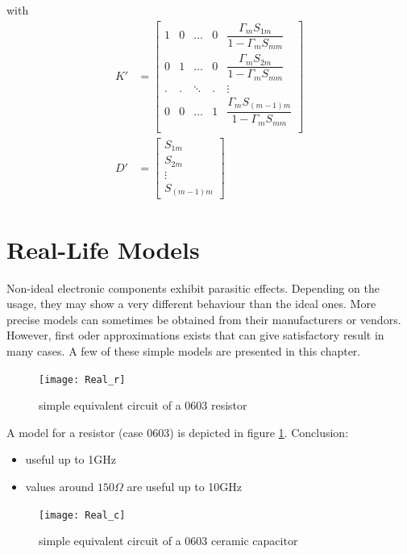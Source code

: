 with
\begin{align}
K' &=
\begin{bmatrix}
1 & 0 & \ldots & 0 & \dfrac{\Gamma_m S_{1m}}{1 - \Gamma_m S_{mm}}\\
0 & 1 & \ldots & 0 & \dfrac{\Gamma_m S_{2m}}{1 - \Gamma_m S_{mm}}\\
. & . & \ddots & . & \vdots\\
0 & 0 & \ldots & 1 & \dfrac{\Gamma_m S_{(m-1)m}}{1 - \Gamma_m S_{mm}}\\
\end{bmatrix}\\
D' &=
\begin{bmatrix}
S_{1m}\\
S_{2m}\\
\vdots\\
S_{(m-1)m}
\end{bmatrix}
\end{align}


\section{Real-Life Models}

Non-ideal electronic components exhibit parasitic effects.
Depending on the usage, they may show a very different behaviour than
the ideal ones. More precise models can sometimes be obtained from their
manufacturers or vendors. However, first oder approximations exists
that can give satisfactory result in many cases. A few of these simple
models are presented in this chapter.

\addvspace{12pt}

\begin{figure}[ht]
\begin{center}
\texttt{[image: Real\_r]}
\end{center}
\caption{simple equivalent circuit of a 0603 resistor}
\label{fig:real_r}
\end{figure}
\FloatBarrier

A model for a resistor (case 0603) is depicted in figure \ref{fig:real_r}.
Conclusion:
\begin{itemize}
\item useful up to 1GHz
\item values around $150\Omega$ are useful up to 10GHz
\end{itemize}

\addvspace{12pt}

\begin{figure}[ht]
\begin{center}
\texttt{[image: Real\_c]}
\end{center}
\caption{simple equivalent circuit of a 0603 ceramic capacitor}
\label{fig:real_c}
\end{figure}
\FloatBarrier

